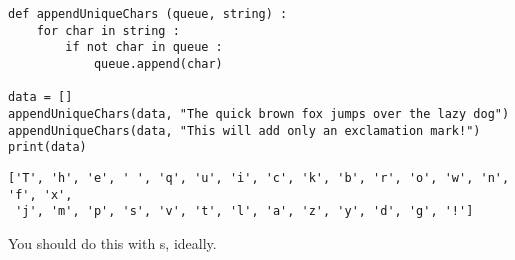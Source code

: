 
\begin{frame}[fragile]
%
\begin{codebox}
\begin{verbatim}
def appendUniqueChars (queue, string) :
    for char in string :
        if not char in queue :
            queue.append(char)

data = []
appendUniqueChars(data, "The quick brown fox jumps over the lazy dog")
appendUniqueChars(data, "This will add only an exclamation mark!")
print(data)
\end{verbatim}
\end{codebox}
%
\begin{cmdbox}
\begin{verbatim}
['T', 'h', 'e', ' ', 'q', 'u', 'i', 'c', 'k', 'b', 'r', 'o', 'w', 'n', 'f', 'x',
 'j', 'm', 'p', 's', 'v', 't', 'l', 'a', 'z', 'y', 'd', 'g', '!']
\end{verbatim}
\end{cmdbox}
%
\begin{hintbox}
You should do this with s, ideally.
\end{hintbox}
%
\end{frame}